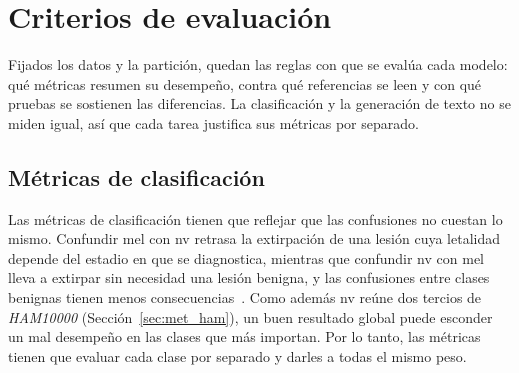 
\section{Criterios de evaluación}
\label{sec:met_protocolo}

Fijados los datos y la partición, quedan las reglas con que se evalúa cada modelo: qué métricas resumen su desempeño,
contra qué referencias se leen y con qué pruebas se sostienen las diferencias. La clasificación y la generación de texto
no se miden igual, así que cada tarea justifica sus métricas por separado.

\subsection{Métricas de clasificación}
\label{sec:met_seleccion}

Las métricas de clasificación tienen que reflejar que las confusiones no cuestan lo mismo. Confundir \gls{mel} con
\gls{nv} retrasa la extirpación de una lesión cuya letalidad depende del estadio en que se diagnostica, mientras que
confundir \gls{nv} con \gls{mel} lleva a extirpar sin necesidad una lesión benigna, y las confusiones entre clases
benignas tienen menos consecuencias~\cite{tschandl2018ham10000,nci2026melanoma}. Como además \gls{nv} reúne dos tercios
de \emph{HAM10000} (Sección~\ref{sec:met_ham}), un buen resultado global puede esconder un mal desempeño en las clases
que más importan. Por lo tanto, las métricas tienen que evaluar cada clase por separado y darles a todas el mismo peso.

